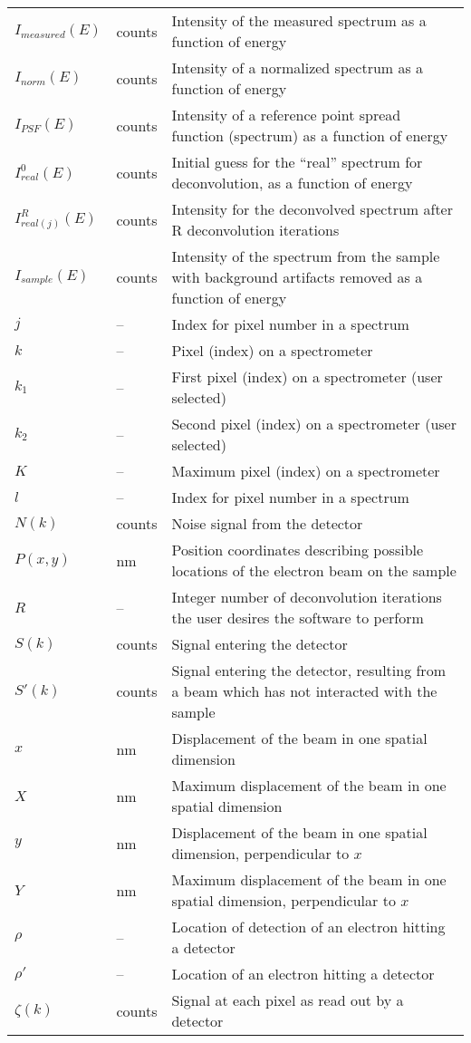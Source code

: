 \documentclass[12pt]{article}
\begin{document}
\begin{longtable*}{l l p{12cm}}
$I_{measured}(E)$ & counts & Intensity of the measured spectrum as a function of energy\\
$I_{norm}(E)$ & counts & Intensity of a normalized spectrum as a function of energy\\
$I_{PSF}(E)$ & counts & Intensity of a reference point spread function (spectrum) as a function of energy\\
$I_{real}^0(E)$ & counts & Initial guess for the ``real'' spectrum for deconvolution, as a function of energy\\
$I_{real (j)}^R(E)$ & counts & Intensity for the deconvolved spectrum after R deconvolution iterations\\
$I_{sample}(E)$ & counts & Intensity of the spectrum from the sample with background artifacts removed as a function of energy\\
$j$ & -- & Index for pixel number in a spectrum\\
$k$ & -- & Pixel (index) on a spectrometer\\
$k_1$ & -- & First pixel (index) on a spectrometer (user selected)\\
$k_2$ & -- & Second pixel (index) on a spectrometer (user selected)\\
$K$ & -- & Maximum pixel (index) on a spectrometer\\
$l$ & -- & Index for pixel number in a spectrum\\
$N(k)$ & counts & Noise signal from the detector\\
$P(x,y)$ & \si{\nano\metre} & Position coordinates describing possible locations of the electron beam on the sample\\
$R$ & -- & Integer number of deconvolution iterations the user desires the software to perform\\
$S(k)$ & counts & Signal entering the detector\\
$S'(k)$ & counts & Signal entering the detector, resulting from a beam which has not interacted with the sample\\
$x$ & \si{\nano\metre} & Displacement of the beam in one spatial dimension\\
$X$ & \si{\nano\metre} & Maximum displacement of the beam in one spatial dimension\\
$y$ & \si{\nano\metre} & Displacement of the beam in one spatial dimension, perpendicular to $x$\\
$Y$ & \si{\nano\metre} & Maximum displacement of the beam in one spatial dimension, perpendicular to $x$\\
$\rho$ & -- & Location of detection of an electron hitting a detector\\
$\rho'$ & -- & Location of an electron hitting a detector\\
$\zeta(k)$ & counts & Signal at each pixel as read out by a detector\\
\bottomrule
\end{longtable*}
\end{document}
